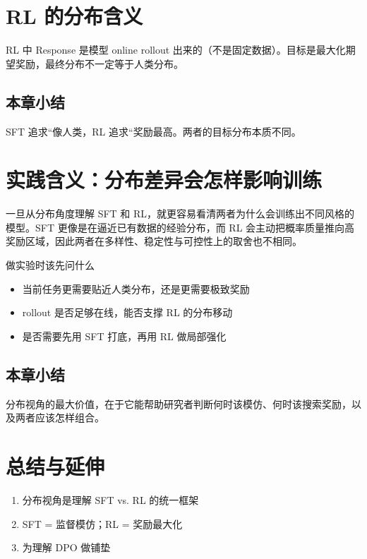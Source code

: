 \documentclass[a4paper]{article}
\begin{document}
\section{RL 的分布含义}
RL 中 Response 是模型 online rollout 出来的（不是固定数据）。目标是最大化期望奖励，最终分布不一定等于人类分布。

\subsection{本章小结}
SFT 追求``像人类，RL 追求``奖励最高。两者的目标分布本质不同。

\newpage
\section{实践含义：分布差异会怎样影响训练}
一旦从分布角度理解 SFT 和 RL，就更容易看清两者为什么会训练出不同风格的模型。SFT 更像是在逼近已有数据的经验分布，而 RL 会主动把概率质量推向高奖励区域，因此两者在多样性、稳定性与可控性上的取舍也不相同。

\begin{knowledgebox}{做实验时该先问什么}
\begin{itemize}
  \item 当前任务更需要贴近人类分布，还是更需要极致奖励
  \item rollout 是否足够在线，能否支撑 RL 的分布移动
  \item 是否需要先用 SFT 打底，再用 RL 做局部强化
\end{itemize}
\end{knowledgebox}

\subsection{本章小结}
分布视角的最大价值，在于它能帮助研究者判断何时该模仿、何时该搜索奖励，以及两者应该怎样组合。

\newpage
\section{总结与延伸}
\begin{enumerate}
  \item 分布视角是理解 SFT vs. RL 的统一框架
  \item SFT = 监督模仿；RL = 奖励最大化
  \item 为理解 DPO 做铺垫
\end{enumerate}
\end{document}
